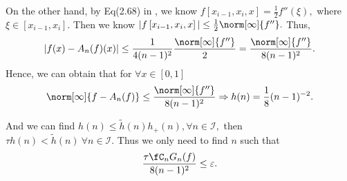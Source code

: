 On the other hand, by Eq(2.68) in \cite{walter},
we know
$f\left[x_{i-1},x_{i},x\right]=\frac{1}{2}f''(\xi),$ where $\xi \in [x_{i-1},x_{i}].$
Then we know
$
|f\left[x_{i-1},x_{i},x\right] |\leq \frac{1}{2}\norm[\infty]{f''}.$
Thus,
$$
|f(x)-A_{n}(f)(x)|\leq \frac{1}{4(n-1)^2}\frac{\norm[\infty]{f''}}{2}=\frac{\norm[\infty]{f''}}{8(n-1)^2}.
$$
Hence, we can obtain that for $\forall x \in [0,1]$
$$\norm[\infty]{f-A_{n}(f)} \leq  \frac{\norm[\infty]{f''}}{8(n-1)^{2}} \Rightarrow h(n)=\frac{1}{8}(n-1)^{-2}.$$



%
%
%
%
%

And we can find  $h(n) \leq \tilde{h}(n) h_{+}(n), \forall n \in \mathcal{I},$ then $ \tau h(n)< \tilde{h}(n) \ \forall n \in \mathcal{I}.$
Thus we only need to find $n$ such that  \[
\frac{\tau \fC_n G_{n}(f)}{8(n-1)^2} \le \varepsilon.
\]

